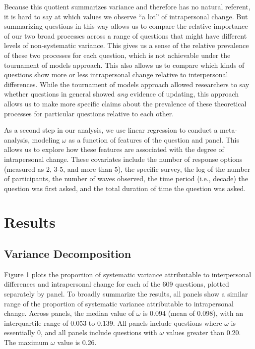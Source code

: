 \documentclass[
  12pt,
]{article}
\begin{document}
Because this quotient summarizes variance and therefore has no natural
referent, it is hard to say at which values we observe ``a lot'' of
intrapersonal change. But summarizing questions in this way allows us to
compare the relative importance of our two broad processes across a
range of questions that might have different levels of non-systematic
variance. This gives us a sense of the relative prevalence of these two
processes for each question, which is not achievable under the
tournament of models approach. This also allows us to compare which
kinds of questions show more or less intrapersonal change relative to
interpersonal differences. While the tournament of models approach
allowed researchers to say whether questions in general showed
\emph{any} evidence of updating, this approach allows us to make more
specific claims about the prevalence of these theoretical processes for
particular questions relative to each other.

As a second step in our analysis, we use linear regression to conduct a
meta-analysis, modeling \(\omega\) as a function of features of the
question and panel. This allows us to explore how these features are
associated with the degree of intrapersonal change. These covariates
include the number of response options (measured as 2, 3-5, and more
than 5), the specific survey, the log of the number of participants, the
number of waves observed, the time period (i.e., decade) the question
was first asked, and the total duration of time the question was asked.

\hypertarget{results}{%
\section{Results}\label{results}}

\hypertarget{variance-decomposition}{%
\subsection{Variance Decomposition}\label{variance-decomposition}}

Figure 1 plots the proportion of systematic variance attributable to
interpersonal differences and intrapersonal change for each of the 609
questions, plotted separately by panel. To broadly summarize the
results, all panels show a similar range of the proportion of systematic
variance attributable to intrapersonal change. Across panels, the median
value of \(\omega\) is 0.094 (mean of 0.098), with an interquartile
range of 0.053 to 0.139. All panels include questions where \(\omega\)
is essentially 0, and all panels include questions with \(\omega\)
values greater than 0.20. The maximum \(\omega\) value is 0.26.
\end{document}
